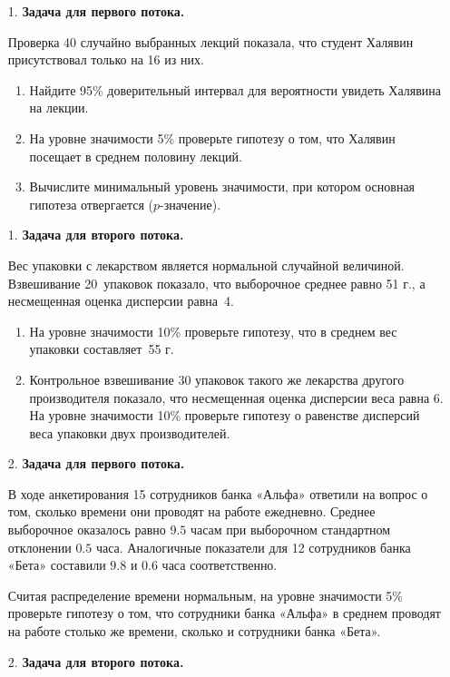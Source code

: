 \begin{enumerate}

\item[1.] \textbf{Задача для первого потока.}

Проверка 40 случайно выбранных лекций показала, что студент Халявин присутствовал
только на 16 из них.
\begin{enumerate}
\item Найдите 95\% доверительный интервал для вероятности увидеть Халявина на лекции.
\item На уровне значимости 5\% проверьте гипотезу о том, что Халявин посещает
в среднем половину лекций.
\item Вычислите минимальный уровень значимости, при котором основная гипотеза
отвергается ($p$-значение).
\end{enumerate}

\item[1.] \textbf{Задача для второго потока.}

Вес упаковки с лекарством является нормальной случайной величиной.
Взвешивание 20~упаковок показало, что выборочное среднее равно 51 г., а
несмещенная оценка дисперсии равна~4.
\begin{enumerate}
\item На уровне значимости 10\% проверьте гипотезу, что в среднем вес упаковки
составляет~55 г.
\item Контрольное взвешивание 30 упаковок такого же лекарства другого производителя
показало, что несмещенная оценка дисперсии веса равна 6. На уровне значимости 10\%
проверьте гипотезу о равенстве дисперсий веса упаковки двух производителей.
\end{enumerate}

\item[2.] \textbf{Задача для первого потока.}

В ходе анкетирования 15 сотрудников банка «Альфа» ответили на вопрос о том,
сколько времени они проводят на работе ежедневно. Среднее выборочное оказалось
равно $9.5$ часам при выборочном стандартном отклонении $0.5$ часа. Аналогичные
показатели для 12 сотрудников банка «Бета» составили $9.8$ и $0.6$ часа соответственно.

Считая распределение времени нормальным, на уровне значимости 5\% проверьте
гипотезу о том, что сотрудники банка «Альфа» в среднем проводят на работе столько
же времени, сколько и сотрудники банка «Бета».

\item[2.] \textbf{Задача для второго потока.}


\end{enumerate}
